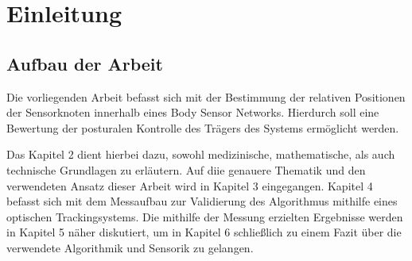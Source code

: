 \chapter{Einleitung}
\section{Aufbau der Arbeit}
Die vorliegenden Arbeit befasst sich mit der Bestimmung der relativen Positionen der Sensorknoten innerhalb eines Body Sensor Networks.
Hierdurch soll eine Bewertung der posturalen Kontrolle des Trägers des Systems ermöglicht werden.

Das Kapitel 2 dient hierbei dazu, sowohl medizinische, mathematische, als auch technische Grundlagen zu erläutern.
Auf diie genauere Thematik und den verwendeten Ansatz dieser Arbeit wird in Kapitel 3 eingegangen.
Kapitel 4 befasst sich mit dem Messaufbau zur Validierung des Algorithmus mithilfe eines optischen Trackingsystems.
Die mithilfe der Messung erzielten Ergebnisse werden in Kapitel 5 näher diskutiert, um in Kapitel 6 schließlich zu einem Fazit über die verwendete Algorithmik und Sensorik zu gelangen.
